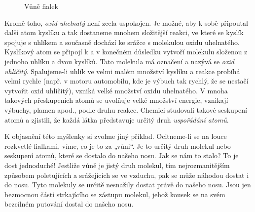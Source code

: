     \begin{figure}[hbt!]    %
      \centering
      \caption{Vůně fialek \cite[s.~24]{Feynman01}}
      \label{fyz:fig015}
    \end{figure}

    Kromě toho, \emph{oxid uhelnatý} není zcela uspokojen. Je možné, aby k sobě připoutal další atom
    kyslíku a tak dostaneme mnohem složitější reakci, ve které se kyslík spojuje s uhlíkem a
    současně dochází ke srážce s molekulou oxidu uhelnatého. Kyslíkový atom se připojí k  a v
    konečném důsledku vytvoří molekulu složenou z jednoho uhlíku a dvou kyslíků. Tato molekula má
    označení  a nazývá se \emph{oxid uhličitý}. Spalujeme-li uhlík ve velmi malém množství
    kyslíku a reakce probíhá velmi rychle (např. v motoru automobilu, kde je výbuch tak rychlý, že
    se nestačí vytvořit oxid uhličitý), vzniká velké množství oxidu uhelnatého. V mnoha takových
    přeskupeních atomů se uvolňuje velké množství energie, vznikají výbuchy, plamen apod., podle
    druhu reakce. Chemici studovali takové seskupení atomů a zjistili, že každá látka představuje
    určitý druh \emph{uspořádání atomů}.

    K objasnění této myšlenky si zvolme jiný příklad. Ocitneme-li se na louce rozkvetlé fialkami,
    víme, co je to za „vůni“. Je to určitý druh molekul nebo seskupení atomů, které se dostalo do
    našeho nosu. Jak se nám to stalo? To je dost jednoduché! Jestliže vůně je jistý druh molekul,
    tím nejrozmanitějším způsobem poletujících a srážejících se ve vzduchu, pak se může náhodou
    dostat i do nosu. Tyto molekuly se určitě nesnažily dostat právě do našeho nosu. Jsou jen
    bezmocnou částí strkajícího se zástupu molekul, jehož kousek se na svém bezcílném putování
    dostal do našeho nosu.      
    
